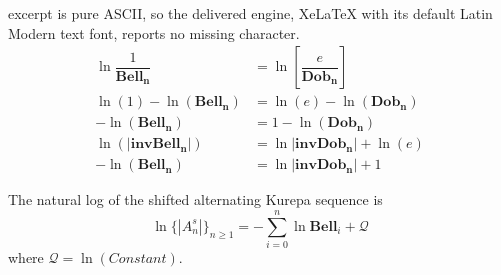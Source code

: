 \documentclass[10pt,a4paper]{amsart}
\begin{document}
excerpt is pure ASCII, so the delivered engine, XeLaTeX with its default Latin Modern text font, reports no missing character.
\begin{align}\label{intropy}
    \ln\dfrac{1}{\mathbf{Bell_n}}&= \ln\left[\dfrac{e}{\mathbf{Dob_n}}\right]\\ \nonumber
   \ln(1)-\ln(\mathbf{Bell_n}) &=\ln(e)-\ln(\mathbf{Dob_n})\\ \nonumber
   -\ln(\mathbf{Bell_n}) &=1-\ln(\mathbf{Dob_n})\\\nonumber 
  \ln(\mathbf{|invBell_n|}) &=\ln\mathbf{|invDob_n|} + \ln(e) \\\nonumber
   -\ln(\mathbf{Bell_n}) &=\ln|\mathbf{invDob_n}| + 1 
\end{align}

\begin{theorem}
The natural log of the shifted alternating Kurepa sequence is
$$\ln\lbrace |A_n^s|\rbrace_{n\geq 1}=-\sum_{i=0}^{n}\ln\mathbf{Bell}_i +\mathcal{Q}$$
where $\mathcal{Q}=\ln(Constant).$

\end{theorem}
\end{document}
